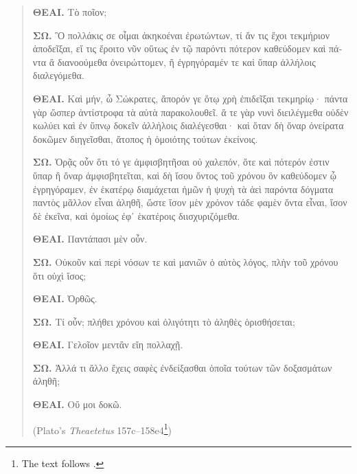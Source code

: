 \begin{quote}
\begin{greek}
{        \textbf{ΘΕΑΙ.} Τὸ ποῖον;

        \textbf{ΣΩ.} Ὃ πολλάκις σε οἶμαι ἀκηκοέναι ἐρωτώντων, τί ἄν τις ἔχοι τεκμήριον ἀποδεῖξαι, εἴ τις ἔροιτο νῦν οὕτως ἐν τῷ παρόντι πότερον καθεύδομεν καὶ πάντα ἃ διανοούμεθα ὀνειρώττομεν, ἢ ἐγρηγόραμέν τε καὶ ὕπαρ ἀλλήλοις διαλεγόμεθα.

        \textbf{ΘΕΑΙ.} Καὶ μήν, ὦ Σώκρατες, ἄπορόν γε ὅτῳ χρὴ ἐπιδεῖξαι τεκμηρίῳ· πάντα γὰρ ὥσπερ ἀντίστροφα τὰ αὐτὰ παρακολουθεῖ. ἅ τε γὰρ νυνὶ διειλέγμεθα οὐδὲν κωλύει καὶ ἐν ὕπνῳ δοκεῖν ἀλλήλοις διαλέγεσθαι· καὶ ὅταν δὴ ὄναρ ὀνείρατα δοκῶμεν διηγεῖσθαι, ἄτοπος ἡ ὁμοιότης τούτων ἐκείνοις.

        \textbf{ΣΩ.} Ὁρᾷς οὖν ὅτι τό γε ἀμφισβητῆσαι οὐ χαλεπόν, ὅτε καὶ πότερόν ἐστιν ὕπαρ ἢ ὄναρ ἀμφισβητεῖται, καὶ δὴ ἴσου ὄντος τοῦ χρόνου ὃν καθεύδομεν ᾧ ἐγρηγόραμεν, ἐν ἑκατέρῳ διαμάχεται ἡμῶν ἡ ψυχὴ τὰ ἀεὶ παρόντα δόγματα παντὸς μᾶλλον εἶναι ἀληθῆ, ὥστε ἴσον μὲν χρόνον τάδε φαμὲν ὄντα εἶναι, ἴσον δὲ ἐκεῖνα, καὶ ὁμοίως ἐφ᾽ ἑκατέροις διισχυριζόμεθα.

        \textbf{ΘΕΑΙ.} Παντάπασι μὲν οὖν.

        \textbf{ΣΩ.} Οὐκοῦν καὶ περὶ νόσων τε καὶ μανιῶν ὁ αὐτὸς λόγος, πλὴν τοῦ χρόνου ὅτι οὐχὶ ἴσος;

        \textbf{ΘΕΑΙ.} Ὀρθῶς.

        \textbf{ΣΩ.} Τί οὖν; πλήθει χρόνου καὶ ὀλιγότητι τὸ ἀληθὲς ὁρισθήσεται;

        \textbf{ΘΕΑΙ.} Γελοῖον μεντἂν εἴη πολλαχῇ.

        \textbf{ΣΩ.} Ἀλλά τι ἄλλο ἔχεις σαφὲς ἐνδείξασθαι ὁποῖα τούτων τῶν δοξασμάτων ἀληθῆ;

        \textbf{ΘΕΑΙ.} Οὔ μοι δοκῶ.} (Plato's \textit{Theaetetus} 157c--158e4\footnote{The text follows \cite{plato1995}.})
    \end{greek}
\end{quote}

